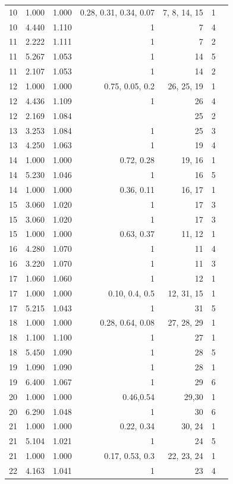 \documentclass{amsart}
\begin{document}
\begin{table}[!htp]
\begin{tabular}{lrrrrrr}
        10 &1.000 &1.000 &0.28, 0.31, 0.34, 0.07 &7, 8, 14, 15 &1 \\
        10 &4.440 &1.110 &1 &7 &4 \\
        11 &2.222 &1.111 &1 &7 &2 \\
        11 &5.267 &1.053 &1 &14 &5 \\
        11 &2.107 &1.053 &1 &14 &2 \\
        12 &1.000 &1.000 &0.75, 0.05, 0.2 &26, 25, 19 &1 \\
        12 &4.436 &1.109 &1 &26 &4 \\
        12 &2.169 &1.084 & &25 &2 \\
        13 &3.253 &1.084 &1 &25 &3 \\
        13 &4.250 &1.063 &1 &19 &4 \\
        14 &1.000 &1.000 &0.72, 0.28 &19, 16 &1 \\
        14 &5.230 &1.046 &1 &16 &5 \\
        14 &1.000 &1.000 &0.36, 0.11 &16, 17 &1 \\
        15 &3.060 &1.020 &1 &17 &3 \\
        15 &3.060 &1.020 &1 &17 &3 \\
        15 &1.000 &1.000 &0.63, 0.37 &11, 12 &1 \\
        16 &4.280 &1.070 &1 &11 &4 \\
        16 &3.220 &1.070 &1 &11 &3 \\
        17 &1.060 &1.060 &1 &12 &1 \\
        17 &1.000 &1.000 &0.10, 0.4, 0.5 &12, 31, 15 &1 \\
        17 &5.215 &1.043 &1 &31 &5 \\
        18 &1.000 &1.000 &0.28, 0.64, 0.08 &27, 28, 29 &1 \\
        18 &1.100 &1.100 &1 &27 &1 \\
        18 &5.450 &1.090 &1 &28 &5 \\
        19 &1.090 &1.090 &1 &28 &1 \\
        19 &6.400 &1.067 &1 &29 &6 \\
        20 &1.000 &1.000 &0.46,0.54 &29,30 &1 \\
        20 &6.290 &1.048 &1 &30 &6 \\
        21 &1.000 &1.000 &0.22, 0.34 &30, 24 &1 \\
        21 &5.104 &1.021 &1 &24 &5 \\
        21 &1.000 &1.000 &0.17, 0.53, 0.3 &22, 23, 24 &1 \\
        22 &4.163 &1.041 &1 &23 &4 \\

\end{tabular}
\end{table}
\end{document}
